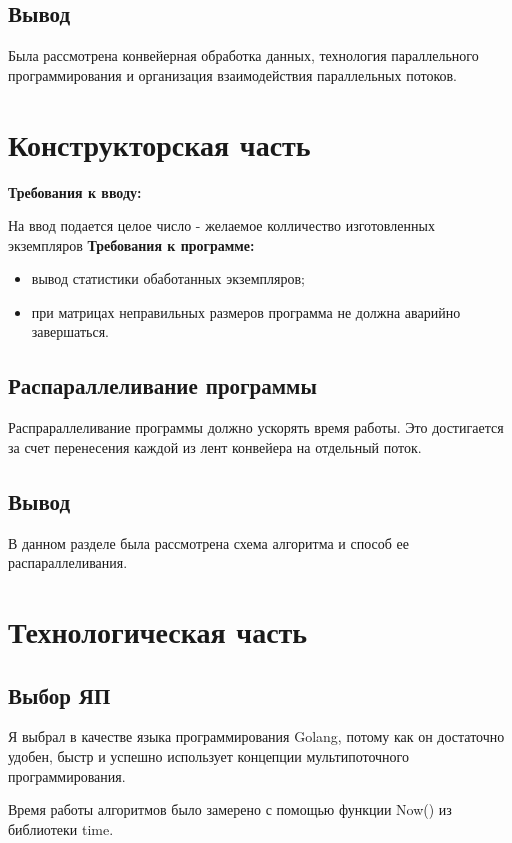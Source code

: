 \documentclass[12pt]{report}
\begin{document}
\section{Вывод}
Была рассмотрена конвейерная обработка данных, технология параллельного программирования и
организация взаимодействия параллельных потоков.

\chapter{Конструкторская часть}
\textbf{Требования к вводу:}

На ввод подается целое число - желаемое колличество изготовленных экземпляров
\newline
\textbf{Требования к программе:}
\begin{itemize}
	\item вывод статистики обаботанных экземпляров;
	\item при матрицах неправильных размеров программа не должна аварийно завершаться.
\end{itemize}

\section{Распараллеливание программы}
Распрараллеливание программы должно ускорять время работы. Это достигается за счет перенесения каждой из лент конвейера на отдельный поток.

\section{Вывод}
В данном разделе была рассмотрена схема алгоритма и способ ее распараллеливания.

\chapter{Технологическая часть}
\section{Выбор ЯП}
Я выбрал в качестве языка программирования Golang, потому как он достаточно удобен, быстр и успешно использует концепции мультипоточного программирования.

Время работы алгоритмов было замерено с помощью функции Now() из библиотеки time.
\end{document}
